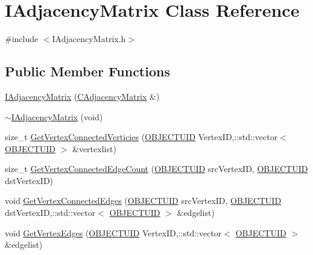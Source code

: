 \hypertarget{class_i_adjacency_matrix}{}\section{I\+Adjacency\+Matrix Class Reference}
\label{class_i_adjacency_matrix}


{\ttfamily \#include $<$I\+Adjacency\+Matrix.\+h$>$}

\subsection*{Public Member Functions}
\begin{DoxyCompactItemize}
\item 
\hyperlink{class_i_adjacency_matrix_af708f0717ec187129059a4d65bff963a}{I\+Adjacency\+Matrix} (\hyperlink{class_c_adjacency_matrix}{C\+Adjacency\+Matrix} \&)
\item 
\hyperlink{class_i_adjacency_matrix_a6410a158dc6a0faf8553c239c47bed47}{$\sim$\+I\+Adjacency\+Matrix} (void)
\item 
size\+\_\+t \hyperlink{class_i_adjacency_matrix_a1e91250803acf81a16b6419f4f0da6e3}{Get\+Vertex\+Connected\+Verticies} (\hyperlink{_object_database_defines_8h_a164ec120b01429b93c9cd0bef2a67e64}{O\+B\+J\+E\+C\+T\+U\+I\+D} Vertex\+I\+D,\+::std\+::vector$<$ \hyperlink{_object_database_defines_8h_a164ec120b01429b93c9cd0bef2a67e64}{O\+B\+J\+E\+C\+T\+U\+I\+D} $>$ \&vertexlist)
\item 
size\+\_\+t \hyperlink{class_i_adjacency_matrix_aa6df309a2463aa22f18efc14135462aa}{Get\+Vertex\+Connected\+Edge\+Count} (\hyperlink{_object_database_defines_8h_a164ec120b01429b93c9cd0bef2a67e64}{O\+B\+J\+E\+C\+T\+U\+I\+D} src\+Vertex\+I\+D, \hyperlink{_object_database_defines_8h_a164ec120b01429b93c9cd0bef2a67e64}{O\+B\+J\+E\+C\+T\+U\+I\+D} dst\+Vertex\+I\+D)
\item 
void \hyperlink{class_i_adjacency_matrix_a70c72f5711580bf5f23940d628d67f54}{Get\+Vertex\+Connected\+Edges} (\hyperlink{_object_database_defines_8h_a164ec120b01429b93c9cd0bef2a67e64}{O\+B\+J\+E\+C\+T\+U\+I\+D} src\+Vertex\+I\+D, \hyperlink{_object_database_defines_8h_a164ec120b01429b93c9cd0bef2a67e64}{O\+B\+J\+E\+C\+T\+U\+I\+D} dst\+Vertex\+I\+D,\+::std\+::vector$<$ \hyperlink{_object_database_defines_8h_a164ec120b01429b93c9cd0bef2a67e64}{O\+B\+J\+E\+C\+T\+U\+I\+D} $>$ \&edgelist)
\item 
void \hyperlink{class_i_adjacency_matrix_a6c9924bd5fd7396f29df5ab659eec1cc}{Get\+Vertex\+Edges} (\hyperlink{_object_database_defines_8h_a164ec120b01429b93c9cd0bef2a67e64}{O\+B\+J\+E\+C\+T\+U\+I\+D} Vertex\+I\+D,\+::std\+::vector$<$ \hyperlink{_object_database_defines_8h_a164ec120b01429b93c9cd0bef2a67e64}{O\+B\+J\+E\+C\+T\+U\+I\+D} $>$ \&edgelist)

\end{DoxyCompactItemize}
